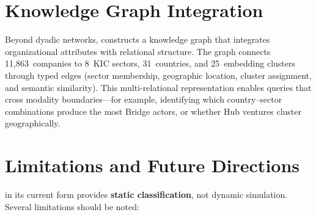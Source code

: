 \documentclass[../main.tex]{subfiles}
\begin{document}
\section*{Knowledge Graph Integration}

Beyond dyadic networks, \RoleSim{} constructs a knowledge graph that
integrates organizational attributes with relational
structure.
The graph connects 11,863~companies to 8~KIC sectors, 31~countries, and
25~embedding clusters through typed edges (sector membership, geographic
location, cluster assignment, and semantic similarity). This multi-relational
representation enables queries that cross modality boundaries---for example,
identifying which country--sector combinations produce the most Bridge actors,
or whether Hub ventures cluster geographically.


\section*{Limitations and Future Directions}

\RoleSim{} in its current form provides \textbf{static classification},
not dynamic simulation.
Several limitations should be noted:
\end{document}
